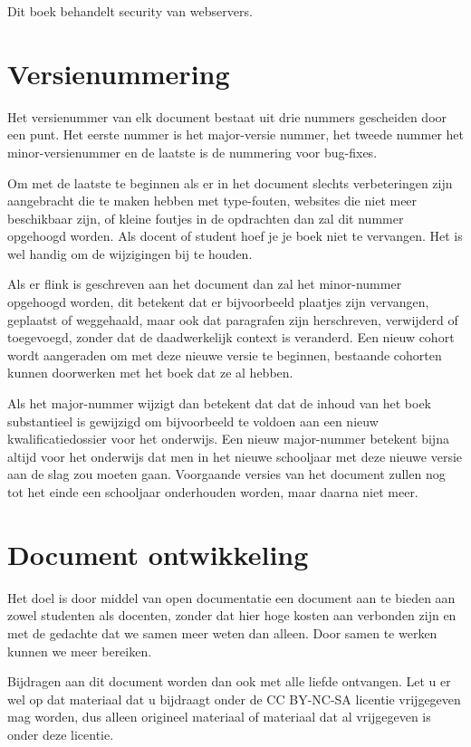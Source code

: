Dit boek behandelt security van webservers.

\section*{Versienummering}
Het versienummer van elk document bestaat uit drie nummers gescheiden door een punt. Het eerste nummer is het major-versie nummer, het tweede nummer het minor-versienummer en de laatste is de nummering voor bug-fixes.\par
Om met de laatste te beginnen als er in het document slechts verbeteringen zijn aangebracht die te maken hebben met type-fouten, websites die niet meer beschikbaar zijn, of kleine foutjes in de opdrachten dan zal dit nummer opgehoogd worden. Als docent of student hoef je je boek niet te vervangen. Het is wel handig om de wijzigingen bij te houden.\par
Als er flink is geschreven aan het document dan zal het minor-nummer opgehoogd worden, dit betekent dat er bijvoorbeeld plaatjes zijn vervangen, geplaatst of weggehaald, maar ook dat paragrafen zijn herschreven, verwijderd of toegevoegd, zonder dat de daadwerkelijk context is veranderd. Een nieuw cohort wordt aangeraden om met deze nieuwe versie te beginnen, bestaande cohorten kunnen doorwerken met het boek dat ze al hebben.\par
Als het major-nummer wijzigt dan betekent dat dat de inhoud van het boek substantieel is gewijzigd om bijvoorbeeld te voldoen aan een nieuw kwalificatiedossier voor het onderwijs. Een nieuw major-nummer betekent bijna altijd voor het onderwijs dat men in het nieuwe schooljaar met deze nieuwe versie aan de slag zou moeten gaan. Voorgaande versies van het document zullen nog tot het einde een schooljaar onderhouden worden, maar daarna niet meer.

\section*{Document ontwikkeling}
Het doel is door middel van open documentatie een document aan te bieden aan zowel studenten als docenten, zonder dat hier hoge kosten aan verbonden zijn en met de gedachte dat we samen meer weten dan alleen. Door samen te werken kunnen we meer bereiken.\par
Bijdragen aan dit document worden dan ook met alle liefde ontvangen. Let u er wel op dat materiaal dat u bijdraagt onder de CC BY-NC-SA licentie vrijgegeven mag worden, dus alleen origineel materiaal of materiaal dat al vrijgegeven is onder deze licentie.
